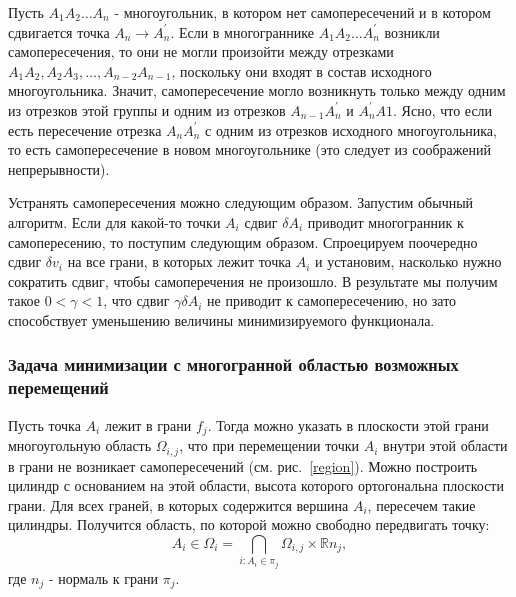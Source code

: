 \documentclass[a4paper,12pt, titlepage]{article}
\begin{document}
\begin{flushleft}
 Пусть $A_{1}A_{2} \ldots A_{n}$ - многоугольник, в котором нет самопересечений и 
в котором сдвигается точка $A_{n} \to A_{n}^{'}$. Если в многограннике $A_{1}A_{2} \ldots A_{n}^{'}$
возникли самопересечения, то они не могли произойти между отрезками 
$A_{1}A_{2}, A_{2}A_{3}, \ldots, A_{n-2}A_{n-1}$, поскольку они входят в состав исходного многоугольника.
Значит, самопересечение могло возникнуть только между одним из отрезков этой группы и одним из 
отрезков $A_{n - 1}A_{n}^{'}$ и $A_{n}^{'}A{1}$. Ясно, что если есть пересечение отрезка $A_{n}A_{n}^{'}$ 
с одним из отрезков исходного многоугольника, то есть самопересечение в новом многоугольнике 
(это следует из соображений непрерывности).
\end{flushleft}

\begin{flushleft}
      Устранять самопересечения можно следующим образом. Запустим обычный алгоритм. Если
для какой-то точки $A_{i}$ сдвиг $\delta A_{i}$ приводит многогранник к самопересению,
то поступим следующим образом. Спроецируем поочередно сдвиг $\delta v_{i}$ на все грани,
в которых лежит точка $A_{i}$ и установим, насколько нужно сократить сдвиг, чтобы 
самоперечения не произошло. В результате мы получим такое $0 < \gamma < 1$,
что сдвиг $\gamma \delta A_{i}$ не приводит к самопересечению, но зато способствует уменьшению
величины минимизируемого функционала.
\end{flushleft}


\subsubsection{Задача минимизации с многогранной областью возможных перемещений}

\begin{flushleft}
      Пусть точка $A_{i}$ лежит в грани $f_{j}$. Тогда можно указать в плоскости этой грани
многоугольную область $\Omega_{i, j}$, что при перемещении точки $A_{i}$ внутри этой области
в грани не возникает самопересечений (см. рис.~\ref{region}). Можно построить 
цилиндр с основанием на этой области,
высота которого ортогональна плоскости грани. Для всех граней,
в которых содержится вершина $A_{i}$, пересечем такие цилиндры. Получится область,
по которой можно свободно передвигать точку:
\begin{equation}
 A_{i} \in \Omega_{i} = \bigcap\limits_{i: A_{i} \in \pi_{j}} 
\Omega_{i, j} \times \mathbb{R}n_{j},
\end{equation}
где $n_{j}$ - нормаль к грани $\pi_{j}$.
\end{flushleft}
\end{document}
